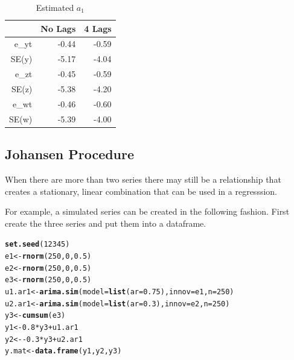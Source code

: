 \documentclass{article}\usepackage{graphicx, color}
\makeatletter
\newcommand{\hlfunctioncall}[1]{\textcolor[rgb]{0.501960784313725,0,0.329411764705882}{\textbf{#1}}}%
\newenvironment{kframe}{%
 \def\at@end@of@kframe{}%
 \ifinner\ifhmode%
  \def\at@end@of@kframe{\end{minipage}}%
  \begin{minipage}{\columnwidth}%
 \fi\fi%
 \def\FrameCommand##1{\hskip\@totalleftmargin \hskip-\fboxsep
 \colorbox{shadecolor}{##1}\hskip-\fboxsep
     \hskip-\linewidth \hskip-\@totalleftmargin \hskip\columnwidth}%
 \MakeFramed {\advance\hsize-\width
   \@totalleftmargin\z@ \linewidth\hsize
   \@setminipage}}%
 {\par\unskip\endMakeFramed%
 \at@end@of@kframe}
\newenvironment{knitrout}{}{} %
\makeatother
\begin{document}
\begin{table}[ht]
\begin{center}
\begin{tabular}{rrr}
  \hline
 & No Lags & 4 Lags \\ 
  \hline
e\_yt & -0.44 & -0.59 \\ 
  SE(y) & -5.17 & -4.04 \\ 
  e\_zt & -0.45 & -0.59 \\ 
  SE(z) & -5.38 & -4.20 \\ 
  e\_wt & -0.46 & -0.60 \\ 
  SE(w) & -5.39 & -4.00 \\ 
   \hline
\end{tabular}
\caption{Estimated $a_1$}
\end{center}
\end{table}



\subsection{Johansen Procedure}
When there are more than two series there may still be a relationship that creates a stationary, linear combination that can be used in a regresssion.  

For example, a simulated series can be created in the following fashion. First create the three series and put them into a dataframe.  
\begin{knitrout}
\color{fgcolor}\begin{kframe}
\begin{alltt}
\hlfunctioncall{set.seed}(12345)
e1 <- \hlfunctioncall{rnorm}(250, 0, 0.5)
e2 <- \hlfunctioncall{rnorm}(250, 0, 0.5)
e3 <- \hlfunctioncall{rnorm}(250, 0, 0.5)
u1.ar1 <- \hlfunctioncall{arima.sim}(model = \hlfunctioncall{list}(ar = 0.75), innov = e1, n = 250)
u2.ar1 <- \hlfunctioncall{arima.sim}(model = \hlfunctioncall{list}(ar = 0.3), innov = e2, n = 250)
y3 <- \hlfunctioncall{cumsum}(e3)
y1 <- 0.8 * y3 + u1.ar1
y2 <- -0.3 * y3 + u2.ar1
y.mat <- \hlfunctioncall{data.frame}(y1, y2, y3)
\end{alltt}
\end{kframe}
\end{knitrout}
\end{document}
